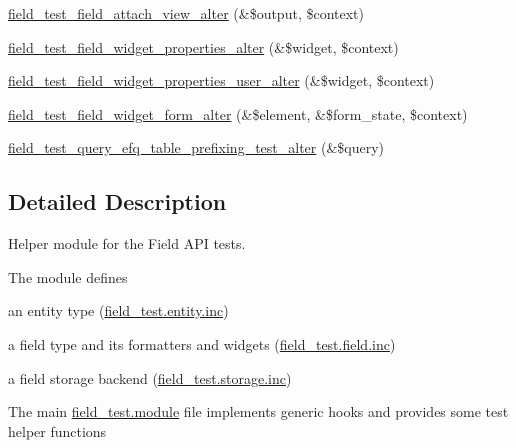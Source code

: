\begin{DoxyCompactItemize}
\item 
\hyperlink{field__test_8module_ab4836ef0c380beae6ac246620f3c3b9b}{field\_\-test\_\-field\_\-attach\_\-view\_\-alter} (\&\$output, \$context)
\item 
\hyperlink{field__test_8module_a9ae0d3439f5afbd93be40ff21b229985}{field\_\-test\_\-field\_\-widget\_\-properties\_\-alter} (\&\$widget, \$context)
\item 
\hyperlink{field__test_8module_a7b260f9df700defdebb5dd957512f799}{field\_\-test\_\-field\_\-widget\_\-properties\_\-user\_\-alter} (\&\$widget, \$context)
\item 
\hyperlink{field__test_8module_ab697abc140bc395e9712230bb49e10b7}{field\_\-test\_\-field\_\-widget\_\-form\_\-alter} (\&\$element, \&\$form\_\-state, \$context)
\item 
\hyperlink{field__test_8module_afb32a3e4eb6fcc25c526997ccb48cba1}{field\_\-test\_\-query\_\-efq\_\-table\_\-prefixing\_\-test\_\-alter} (\&\$query)
\end{DoxyCompactItemize}


\subsection{Detailed Description}
Helper module for the Field API tests.

The module defines
\begin{DoxyItemize}
\item an entity type (\hyperlink{field__test_8entity_8inc}{field\_\-test.entity.inc})
\item a field type and its formatters and widgets (\hyperlink{field__test_8field_8inc}{field\_\-test.field.inc})
\item a field storage backend (\hyperlink{field__test_8storage_8inc}{field\_\-test.storage.inc})
\end{DoxyItemize}

The main \hyperlink{field__test_8module}{field\_\-test.module} file implements generic hooks and provides some test helper functions 


